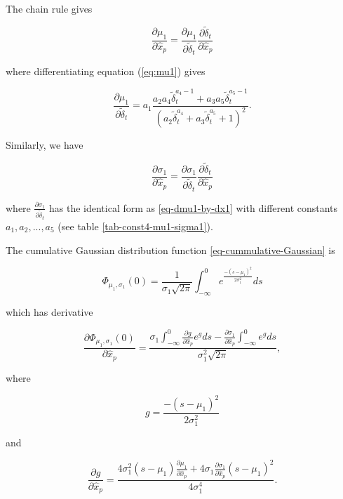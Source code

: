 \documentclass[12pt,double]{article}
\begin{document}
The chain rule gives
\begin{linenomath*} \begin{equation}
\frac{\partial \mu_1}{\partial \hat{x}_p} = \frac{\partial \mu_1}{\partial \widetilde{\delta}_t} \frac{\partial \widetilde{\delta}_t}{\partial \hat{x}_p}
\end{equation} \end{linenomath*}
where differentiating equation (\ref{eq:mu1}) gives
\begin{linenomath*} \begin{equation}
\label{eq-dmu1-by-dx1}
\frac{\partial \mu_1}{\partial \widetilde{\delta}_t} = a_1 \frac{a_2 a_4 \widetilde{\delta}_t^{a_4-1} +a_3 a_5 \widetilde{\delta}_t^{a_5-1}}
{\left(a_2 \widetilde{\delta}_t^{a_4} +a_3 \widetilde{\delta}_t^{a_5} +1 \right)^2}.
\end{equation} \end{linenomath*}
Similarly, we have
\begin{linenomath*} \begin{equation}
\frac{\partial \sigma_1}{\partial \hat{x}_p} = \frac{\partial \sigma_1}{\partial \widetilde{\delta}_t} \frac{\partial \widetilde{\delta}_t}
{\partial \hat{x}_p}
\end{equation} \end{linenomath*}
where $\frac{\partial \sigma_1}{\partial \widetilde{\delta}_t}$ has the identical form as \ref{eq-dmu1-by-dx1} with different constants
$a_1,a_2,...,a_5$ (see table \ref{tab-const4-mu1-sigma1}).

The cumulative Gaussian distribution function \ref{eq-cummulative-Gaussian} is
\begin{linenomath*} \begin{equation}
\Phi_{\mu_1,\sigma_1}(0) = \frac{1}{\sigma_1 \sqrt{2 \pi}}
\int_{-\infty}^0 e^{  \frac{-(s-\mu_1)^2}{2\sigma_1^2}  } ds
\end{equation} \end{linenomath*}
which has derivative
\begin{linenomath*} \begin{equation}
\frac{\partial \Phi_{\mu_1,\sigma_1}(0)}{\partial \hat{x}_p} =
\frac{ \sigma_1 \int_{-\infty}^0 \frac{\partial g}{\partial \hat{x}_p} e^g ds -
\frac{\partial \sigma_1}{\partial \hat{x}_p} \int_{-\infty}^0 e^g ds}
{\sigma_1^2 \sqrt{2 \pi}},
\end{equation} \end{linenomath*}
where
\begin{linenomath*} \begin{equation}
g = \frac{-(s-\mu_1)^2}{2 \sigma_1^2}
\end{equation} \end{linenomath*}
and
\begin{linenomath*} \begin{equation}
\frac{\partial g}{\partial \hat{x}_p} = \frac{4 \sigma_1^2 (s-\mu_1) \frac{\partial \mu_1}{\partial \hat{x}_p}
+ 4\sigma_1 \frac{\partial \sigma_1}{\partial \hat{x}_p}(s-\mu_1)^2}
{4 \sigma_1^4}.
\end{equation} \end{linenomath*}
\end{document}
